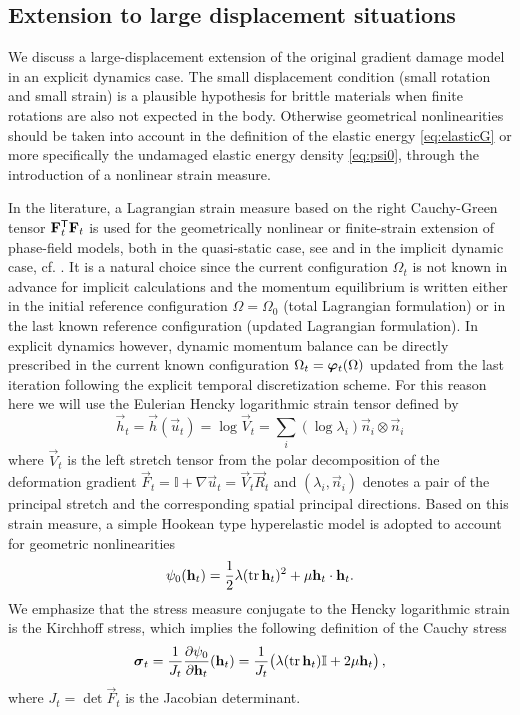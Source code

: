 \subsection{Extension to large displacement situations} \label{sec:extensions}
We discuss a large-displacement extension of the original gradient damage model in an explicit dynamics case. The small displacement condition (small rotation and small strain) is a plausible hypothesis for brittle materials when finite rotations are also not expected in the body. Otherwise geometrical nonlinearities should be taken into account in the definition of the elastic energy \eqref{eq:elasticG} or more specifically the undamaged elastic energy density \eqref{eq:psi0}, through the introduction of a nonlinear strain measure.

In the literature, a Lagrangian strain measure based on the right Cauchy-Green tensor $\vec{F}_t^\mT\vec{F}_t$ is used for the geometrically nonlinear or finite-strain extension of phase-field models, both in the quasi-static case, see \cite{PieroLancioniMarch:2007,ClaytonKnap:2014,MieheSchaenzel:2014,MieheSchaenzelUlmer:2015} and in the implicit dynamic case, cf. \cite{HeschWeinberg:2014,MieheHofackerSchaenzelAldakheel:2015}. It is a natural choice since the current configuration $\Omega_t$ is not known in advance for implicit calculations and the momentum equilibrium is written either in the initial reference configuration $\Omega=\Omega_0$ (total Lagrangian formulation) or in the last known reference configuration (updated Lagrangian formulation). In explicit dynamics however, dynamic momentum balance can be directly prescribed in the current known configuration $\Omega_t=\vphi_t(\Omega)$ updated from the last iteration following the explicit temporal discretization scheme. For this reason here we will use the Eulerian Hencky logarithmic strain tensor \cite{XiaoBruhnsMeyers:1997} defined by
\begin{equation} \label{eq:logstrain}
\vec{h}_t=\vec{h}(\vec{u}_t)=\log\vec{V}_t=\sum_i(\log\lambda_i)\vec{n}_i\otimes\vec{n}_i
\end{equation}
where $\vec{V}_t$ is the left stretch tensor from the polar decomposition of the deformation gradient $\vec{F}_t=\mathbb{I}+\nabla\vec{u}_t=\vec{V}_t\vec{R}_t$ and $(\lambda_i,\vec{n}_i)$ denotes a pair of the principal stretch and the corresponding spatial principal directions. Based on this strain measure, a simple Hookean type hyperelastic model \cite{XiaoChen:2002} is adopted to account for geometric nonlinearities
\begin{equation}
\psi_0(\vec{h}_t)=\frac{1}{2}\lambda(\tr\vec{h}_t)^2+\mu\vec{h}_t\cdot\vec{h}_t. \label{eq:soundpsi}
\end{equation}
We emphasize that the stress measure conjugate to the Hencky logarithmic strain is the Kirchhoff stress, which implies the following definition of the Cauchy stress
\begin{equation} \label{eq:kirchhoffs}
\sig_t=\frac{1}{J_t}\frac{\partial\psi_0}{\partial\vec{h}_t}(\vec{h}_t)=\frac{1}{J_t}\bigl(\lambda(\tr\vec{h}_t)\mathbb{I}+2\mu\vec{h}_t\bigr)\,,
\end{equation}
where $J_t=\det\vec{F}_t$ is the Jacobian determinant.

